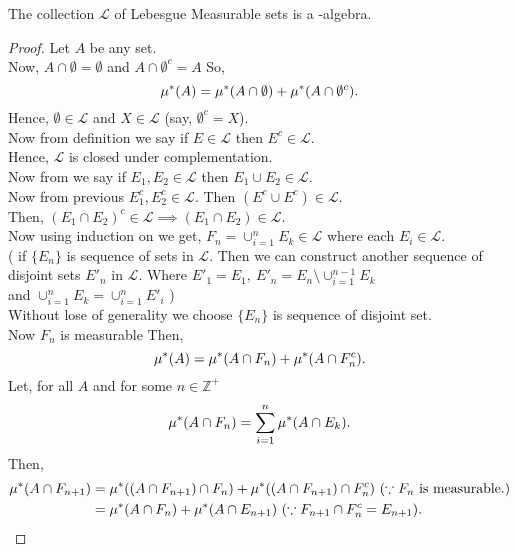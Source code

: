 \begin{theorem}[]
    \label{sigma-algebra}
    The collection $\mathcal{L}$ of Lebesgue Measurable sets is a \sig-algebra.
\end{theorem}
\begin{proof}
    Let $A$ be any set. \\
    Now,  $A\cap\emptyset=\emptyset$ and $A\cap\emptyset^{c}=A$ So,
    \[
        \mu^{*}(A)=\mu^{*}(A\cap\emptyset)+\mu^{*}(A\cap\emptyset^{c}).
    \]
    Hence, $\emptyset\in\mathcal{L}$ and $X\in\mathcal{L}$ (say, $\emptyset^c=X$).\\
    Now from definition we say if $E\in \mathcal{L}$ then  $E^{c}\in\mathcal{L}$.\\
    Hence, $\mathcal{L}$ is closed under complementation.\\
    Now from  we say if  $E_1,E_2\in\mathcal{L}$ then  $E_1\cup E_2\in\mathcal{L}$. \\
    Now from previous $E_1^{c},E_2^{c}\in\mathcal{L}$. Then $(E^{c}\cup E^{c})\in\mathcal{L}$.\\
    Then, $(E_1\cap E_2)^{c}\in\mathcal{L}\implies(E_1\cap E_2)\in\mathcal{L}$.\\
    Now using induction on  we get, $F_n=\cup_{i=1}^{n}E_k\in\mathcal{L}$ where each $E_i\in\mathcal{L}$.\\
    ( 
    if $\{E_n\}$ is sequence of sets in $\mathcal{L}$. Then we can construct another sequence of disjoint sets ${E'_n}$ in  $\mathcal{L}$.
    Where $E'_1=E_1,\ E'_n=E_n\setminus \cup_{i=1}^{n-1}E_k$\\
    and $\cup_{i=1}^{n}E_k=\cup_{i=1}^{n}E'_i$
    )\\
    Without lose of generality we choose $\{E_n\}$ is sequence of disjoint set.\\
    Now $F_n$ is measurable Then,
    \begin{equation}
        \label{Fn measurable}
        \mu^{*}(A)=\mu^{*}(A\cap F_n)+\mu^{*}(A\cap F_n^{c}).
    \end{equation}
    Let, for all $A$ and for some $n\in\mathds{Z}^{+}$ 
    \[
        \mu^{*}(A\cap F_n)=\sum_{i=1}^{n}\mu^{*}(A\cap E_k).
    \]
    Then, 
    \begin{align*}
        \smu(A\cap F_{n+1})&=\smu((A\cap F_{n+1})\cap F_n)+\smu((A\cap F_{n+1})\cap F_n^{c})\ (\because F_n\ \text{is measurable.})\\
                           &=\smu(A\cap F_n)+\smu(A\cap E_{n+1})\ (\because F_{n+1}\cap F_n^{c}=E_{n+1}).\\

\end{align*}
\end{proof}
